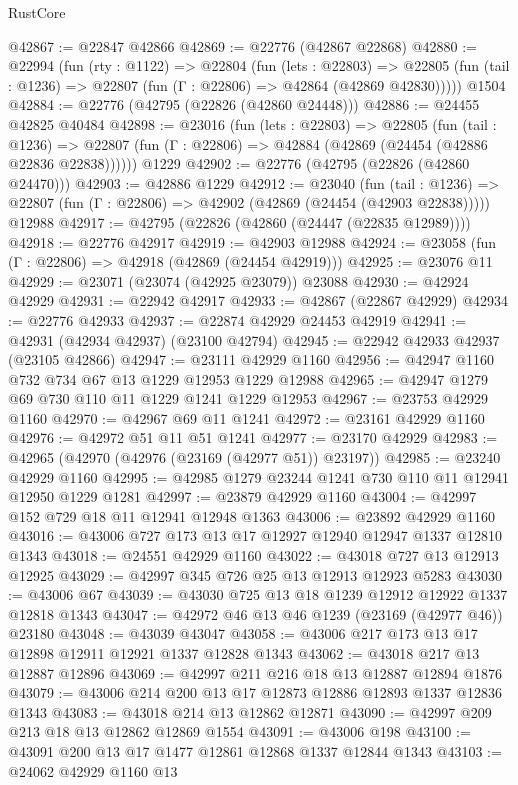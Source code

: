 \begin{lexlean}{RustCore}
\begin{coremodule}
@42867 := @22847 @42866
@42869 := @22776 (@42867 @22868)
@42880 := @22994
    (fun (rty : @1122) =>
    @22804
      (fun (lets : @22803) =>
      @22805 (fun (tail : @1236) => @22807 (fun (Γ : @22806) => @42864 (@42869 @42830)))))
    @1504
@42884 := @22776 (@42795 (@22826 (@42860 @24448)))
@42886 := @24455 @42825 @40484
@42898 := @23016
    (fun (lets : @22803) =>
    @22805
      (fun (tail : @1236) =>
      @22807 (fun (Γ : @22806) => @42884 (@42869 (@24454 (@42886 @22836 @22838))))))
    @1229
@42902 := @22776 (@42795 (@22826 (@42860 @24470)))
@42903 := @42886 @1229
@42912 := @23040
    (fun (tail : @1236) => @22807 (fun (Γ : @22806) => @42902 (@42869 (@24454 (@42903 @22838)))))
    @12988
@42917 := @42795 (@22826 (@42860 (@24447 (@22835 @12989))))
@42918 := @22776 @42917
@42919 := @42903 @12988
@42924 := @23058 (fun (Γ : @22806) => @42918 (@42869 (@24454 @42919)))
@42925 := @23076 @11
@42929 := @23071 (@23074 (@42925 @23079)) @23088
@42930 := @42924 @42929
@42931 := @22942 @42917
@42933 := @42867 (@22867 @42929)
@42934 := @22776 @42933
@42937 := @22874 @42929 @24453 @42919
@42941 := @42931 (@42934 @42937) (@23100 @42794)
@42945 := @22942 @42933 @42937 (@23105 @42866)
@42947 := @23111 @42929 @1160
@42956 := @42947 @1160 @732 @734 @67 @13 @1229 @12953 @1229 @12988
@42965 := @42947 @1279 @69 @730 @110 @11 @1229 @1241 @1229 @12953
@42967 := @23753 @42929 @1160
@42970 := @42967 @69 @11 @1241
@42972 := @23161 @42929 @1160
@42976 := @42972 @51 @11 @51 @1241
@42977 := @23170 @42929
@42983 := @42965 (@42970 (@42976 (@23169 (@42977 @51)) @23197))
@42985 := @23240 @42929 @1160
@42995 := @42985 @1279 @23244 @1241 @730 @110 @11 @12941 @12950 @1229 @1281
@42997 := @23879 @42929 @1160
@43004 := @42997 @152 @729 @18 @11 @12941 @12948 @1363
@43006 := @23892 @42929 @1160
@43016 := @43006 @727 @173 @13 @17 @12927 @12940 @12947 @1337 @12810 @1343
@43018 := @24551 @42929 @1160
@43022 := @43018 @727 @13 @12913 @12925
@43029 := @42997 @345 @726 @25 @13 @12913 @12923 @5283
@43030 := @43006 @67
@43039 := @43030 @725 @13 @18 @1239 @12912 @12922 @1337 @12818 @1343
@43047 := @42972 @46 @13 @46 @1239 (@23169 (@42977 @46)) @23180
@43048 := @43039 @43047
@43058 := @43006 @217 @173 @13 @17 @12898 @12911 @12921 @1337 @12828 @1343
@43062 := @43018 @217 @13 @12887 @12896
@43069 := @42997 @211 @216 @18 @13 @12887 @12894 @1876
@43079 := @43006 @214 @200 @13 @17 @12873 @12886 @12893 @1337 @12836 @1343
@43083 := @43018 @214 @13 @12862 @12871
@43090 := @42997 @209 @213 @18 @13 @12862 @12869 @1554
@43091 := @43006 @198
@43100 := @43091 @200 @13 @17 @1477 @12861 @12868 @1337 @12844 @1343
@43103 := @24062 @42929 @1160 @13

\end{coremodule}
\end{lexlean}
